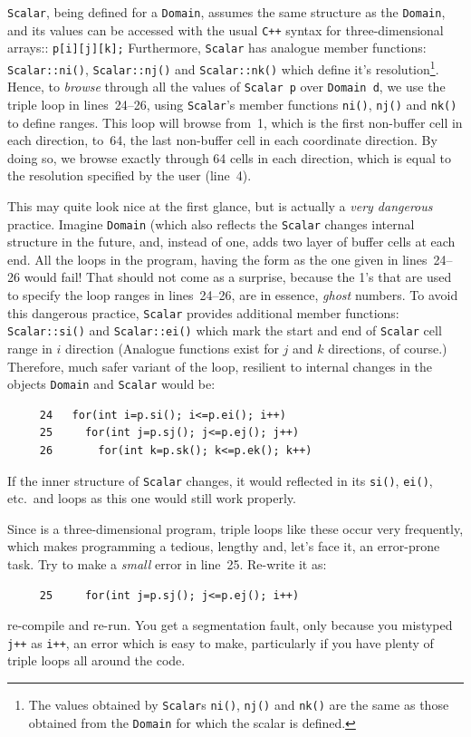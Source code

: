 {\tt Scalar}, being defined for a {\tt Domain}, assumes the same structure as the
{\tt Domain}, and its values can be accessed with the usual {\tt C++} syntax
for three-dimensional arrays::
{\tt p[i][j][k];}
%
Furthermore, {\tt Scalar} has analogue member functions: {\tt Scalar::ni()}, 
{\tt Scalar::nj()} and {\tt Scalar::nk()} which define it's resolution\footnote{The
values obtained by {\tt Scalar}s {\tt ni()}, {\tt nj()} and {\tt nk()} are the
same as those obtained from the {\tt Domain} for which the scalar is defined.}.
Hence, to {\em browse} through all the values of {\tt Scalar p} over {\tt Domain d},
we use the triple loop in lines~24--26, using {\tt Scalar}'s member functions
{\tt ni()}, {\tt nj()} and {\tt nk()} to define ranges. 
%
This loop will browse from~1, which is the
first non-buffer cell in each direction, to~64, the last non-buffer cell in each
coordinate direction. By doing so, we browse exactly through 64 cells in each
direction, which is equal to the resolution specified by the user (line~4). 

This may quite look nice at the first glance, but is actually a {\em very dangerous}
practice. Imagine {\tt Domain} (which also reflects the {\tt Scalar}
changes internal structure in the future, and, instead of one, adds two layer of 
buffer cells at each end. 
All the loops in the program, having the form as the one given in lines~24--26 would fail! 
That should not come as a surprise, because the 1's that are used to specify the loop 
ranges in lines~24--26, are in essence, {\em ghost} numbers. 
To avoid this dangerous practice, {\tt Scalar} provides additional member functions: 
{\tt Scalar::si()} and {\tt Scalar::ei()} which mark the start and end of {\tt Scalar} 
cell range in $i$ direction (Analogue functions exist for $j$ and $k$ directions, of course.) 
Therefore, much safer variant of the loop, resilient to internal changes in
the objects {\tt Domain} and {\tt Scalar} would be:

\newpage

{\small \begin{verbatim}
     24   for(int i=p.si(); i<=p.ei(); i++) 
     25     for(int j=p.sj(); j<=p.ej(); j++) 
     26       for(int k=p.sk(); k<=p.ek(); k++) 
\end{verbatim}}

If the inner structure of {\tt Scalar} changes, it would reflected in its
{\tt si()}, {\tt ei()}, etc.\ and loops as this one would still work
properly. 

Since {\psiboil} is a three-dimensional program, triple loops like these occur very
frequently, which makes programming a tedious, lengthy and, let's face it, an 
error-prone task. Try to make a {\em small} error in line~25. Re-write it as:
%
{\small \begin{verbatim}
     25     for(int j=p.sj(); j<=p.ej(); i++) 
\end{verbatim}}
%
re-compile and re-run. You get a segmentation fault, only because you mistyped
{\tt j++} as {\tt i++}, an error which is easy to make, particularly if you have
plenty of triple loops all around the code. 

